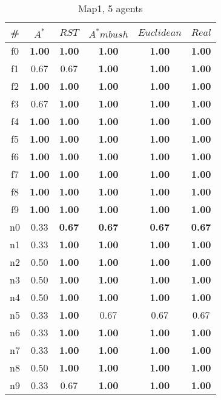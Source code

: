 \begin{table}[h]
\caption{Map1, 5 agents}
\begin{center}

\begin{tabular}{|c|c|c|c|c|c|}
\hline
\# & $A^*$ & $RST$ & $A^*mbush$ & $Euclidean$ & $Real$\\
\hline
f0 & \textbf{1.00} & \textbf{1.00} & \textbf{1.00} & \textbf{1.00} & \textbf{1.00}\\
f1 & 0.67 & 0.67 & \textbf{1.00} & \textbf{1.00} & \textbf{1.00}\\
f2 & \textbf{1.00} & \textbf{1.00} & \textbf{1.00} & \textbf{1.00} & \textbf{1.00}\\
f3 & 0.67 & \textbf{1.00} & \textbf{1.00} & \textbf{1.00} & \textbf{1.00}\\
f4 & \textbf{1.00} & \textbf{1.00} & \textbf{1.00} & \textbf{1.00} & \textbf{1.00}\\
f5 & \textbf{1.00} & \textbf{1.00} & \textbf{1.00} & \textbf{1.00} & \textbf{1.00}\\
f6 & \textbf{1.00} & \textbf{1.00} & \textbf{1.00} & \textbf{1.00} & \textbf{1.00}\\
f7 & \textbf{1.00} & \textbf{1.00} & \textbf{1.00} & \textbf{1.00} & \textbf{1.00}\\
f8 & \textbf{1.00} & \textbf{1.00} & \textbf{1.00} & \textbf{1.00} & \textbf{1.00}\\
f9 & \textbf{1.00} & \textbf{1.00} & \textbf{1.00} & \textbf{1.00} & \textbf{1.00}\\
\hline
n0 & 0.33 & \textbf{0.67} & \textbf{0.67} & \textbf{0.67} & \textbf{0.67}\\
n1 & 0.33 & \textbf{1.00} & \textbf{1.00} & \textbf{1.00} & \textbf{1.00}\\
n2 & 0.50 & \textbf{1.00} & \textbf{1.00} & \textbf{1.00} & \textbf{1.00}\\
n3 & 0.50 & \textbf{1.00} & \textbf{1.00} & \textbf{1.00} & \textbf{1.00}\\
n4 & 0.50 & \textbf{1.00} & \textbf{1.00} & \textbf{1.00} & \textbf{1.00}\\
n5 & 0.33 & \textbf{1.00} & 0.67 & 0.67 & 0.67\\
n6 & 0.33 & \textbf{1.00} & \textbf{1.00} & \textbf{1.00} & \textbf{1.00}\\
n7 & 0.33 & \textbf{1.00} & \textbf{1.00} & \textbf{1.00} & \textbf{1.00}\\
n8 & 0.50 & \textbf{1.00} & \textbf{1.00} & \textbf{1.00} & \textbf{1.00}\\
n9 & 0.33 & 0.67 & \textbf{1.00} & \textbf{1.00} & \textbf{1.00}\\
\hline
\end{tabular}

\label{tab:exp3}
\end{center}
\end{table}
